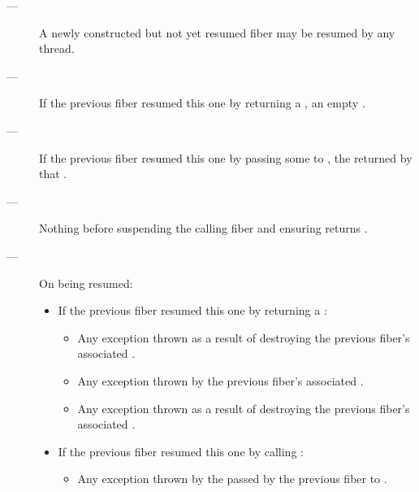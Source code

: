 \remarks
\begin{description}
    \item[---] A newly constructed but not yet resumed fiber may be resumed by
              any thread.
\end{description}

\returns
\begin{description}
    \item[---] If the previous fiber resumed this one by returning a \fiber,
               an empty \fiber.
    \item[---] If the previous fiber resumed this one by passing some 
               to \anyresumewith, the \fiber returned by that .
\end{description}

\except
\begin{description}
    \item[---] Nothing before suspending the calling fiber and
               ensuring \emptyfn returns \true.
    \item[---] On being resumed:
    \begin{itemize}
        \item If the previous fiber resumed this one by returning a \fiber:
            \begin{itemize}
                \item Any exception thrown as a result of destroying the
                      previous fiber's associated .
                \item Any exception thrown by the previous fiber's
                      associated .
                \item Any exception thrown as a result of destroying the
                      previous fiber's associated .
            \end{itemize}
        \item If the previous fiber resumed this one by calling \anyresumewith:
        \begin{itemize}
            \item Any exception thrown by the  passed by the previous
                  fiber to \anyresumewith.
        \end{itemize}
    \end{itemize}
\end{description}

